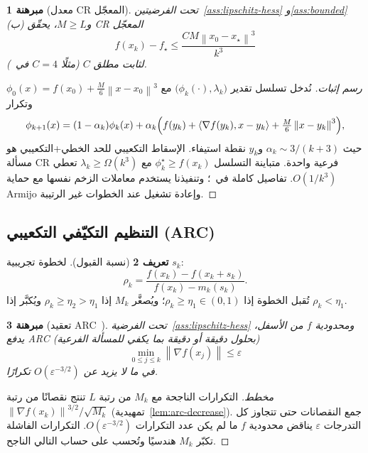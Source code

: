 \documentclass[11pt,a4paper]{article}
\theoremstyle{plain}
\newtheorem{theorem}{مبرهنة}[section]
\theoremstyle{definition}
\newtheorem{definition}[theorem]{تعريف}
\newcommand{\norm}[1]{\left\|#1\right\|}
\newcommand{\inner}[2]{\left\langle #1,#2\right\rangle}
\newcommand{\grad}{\nabla}
\begin{document}
\begin{theorem}[معدل CR المعجّل]
\label{thm:acc-cr}
تحت الفرضيتين~\ref{ass:lipschitz-hess} و\ref{ass:bounded}(ب) و$M\ge L$، يحقّق CR المعجّل
\begin{equation}
f(x_{k})-f_{\star}
\le
\frac{CM\norm{x_{0}-x_{\star}}^{3}}{k^{3}}
\end{equation}
لثابت مطلق $C$ (مثلًا $C=4$ في~\cite{nesterov2008accelerate}).
\end{theorem}

\begin{proof}[رسم إثبات]
نُدخل تسلسل تقدير $\bigl(\phi_{k}(\cdot),\lambda_{k}\bigr)$ مع
$\phi_{0}(x)=f(x_{0})+\frac{M}{6}\norm{x-x_{0}}^{3}$ وتكرار
\[
\phi_{k+1}(x)
=
(1-\alpha_{k})\phi_{k}(x)
+
\alpha_{k}\Bigl(f(y_{k})+\inner{\grad f(y_{k})}{x-y_{k}}+\tfrac{M}{6}\norm{x-y_{k}}^{3}\Bigr),
\]
حيث $\alpha_{k}\sim 3/(k+3)$ و$y_{k}$ نقطة استيفاء.
الإسقاط التكعيبي للحد الخطي+التكعيبي هو مسألة CR فرعية واحدة.
متباينة التسلسل $\phi_{k}^{\star}\ge f(x_{k})$ مع $\lambda_{k}\ge\Omega(k^{3})$ تعطي $O(1/k^{3})$.
تفاصيل كاملة في~\cite{nesterov2008accelerate}؛ وتنفيذنا يستخدم معاملات الزخم نفسها مع حماية Armijo وإعادة تشغيل عند الخطوات غير الرتيبة.
\end{proof}

\subsection{التنظيم التكيّفي التكعيبي (ARC)}

\begin{definition}[نسبة القبول]
\label{def:rho}
لخطوة تجريبية $s_{k}$:
\begin{equation}
\rho_{k}
=
\frac{f(x_{k})-f(x_{k}+s_{k})}{f(x_{k})-m_{k}(s_{k})}.
\end{equation}
تُقبل الخطوة إذا $\rho_{k}\ge\eta_{1}\in(0,1)$؛ ويُصغَّر $M_{k}$ إذا $\rho_{k}\ge\eta_{2}>\eta_{1}$ ويُكبَّر إذا $\rho_{k}<\eta_{1}$.
\end{definition}

\begin{theorem}[تعقيد ARC~\cite{cartis2011arc}]
\label{thm:arc}
تحت الفرضية~\ref{ass:lipschitz-hess} ومحدودية $f$ من الأسفل، يدفع ARC (بحلول دقيقة أو دقيقة بما يكفي للمسألة الفرعية)
\begin{equation}
\min_{0\le j\le k}\norm{\grad f(x_{j})}
\le\varepsilon
\end{equation}
في ما لا يزيد عن $O(\varepsilon^{-3/2})$ تكرارًا.
\end{theorem}

\begin{proof}[مخطط]
التكرارات الناجحة مع $M_{k}$ من رتبة $L$ تنتج نقصانًا من رتبة $\norm{\grad f(x_{k})}^{3/2}/\sqrt{M_{k}}$ (تمهيدية~\ref{lem:arc-decrease}).
جمع النقصانات حتى تتجاوز كل التدرجات $\varepsilon$ يناقض محدودية $f$ ما لم يكن عدد التكرارات $O(\varepsilon^{-3/2})$.
التكرارات الفاشلة تكبّر $M_{k}$ هندسيًا وتُحسب على حساب التالي الناجح.
\end{proof}
\end{document}
